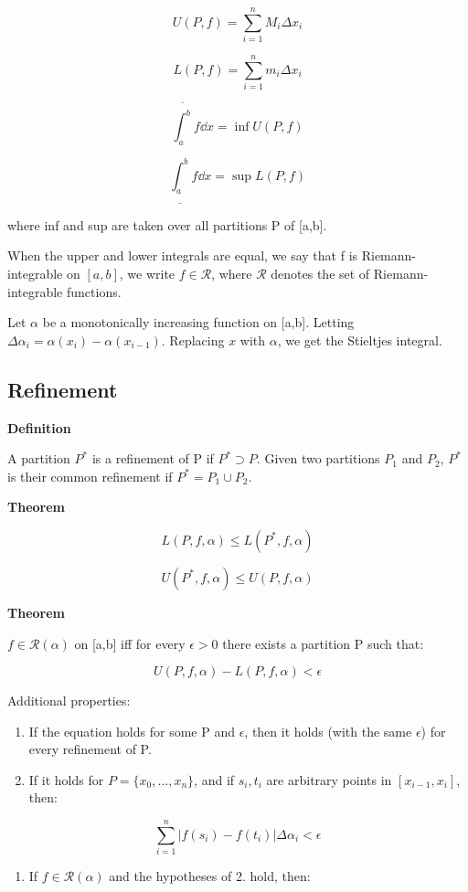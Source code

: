 \documentclass[11pt]{article}
\begin{document}
\[
U(P,f) = \sum_{i=1}^n M_i \Delta x_i
\]

\[
L(P,f) = \sum_{i=1}^n m_i \Delta x_i
\]

\[
\overline{\int_a^b} f \dd{x} = \inf U(P,f)
\]

\[
\underline{\int_a^b} f \dd{x} = \sup L(P,f)
\]

where inf and sup are taken over all partitions P of [a,b].

When the upper and lower integrals are equal, we say that f is Riemann-integrable on \([a,b]\), we write \(f \in \mathcal{R}\), where \(\mathcal{R}\) denotes the set of Riemann-integrable functions.


Let \(\alpha\) be a monotonically increasing function on [a,b]. Letting \(\Delta\alpha_i = \alpha(x_i) - \alpha(x_{i-1})\). Replacing \(x\) with \(\alpha\), we get the Stieltjes integral.

\subsection{Refinement}
\label{sec:orgd763a07}

\textbf{Definition}

A partition \(P^*\) is a refinement of P if \(P^* \supset P\). Given two partitions \(P_1\) and \(P_2\), \(P^*\) is their common refinement if \(P^* = P_1 \cup P_2\).

\textbf{Theorem}

\[
L(P,f,\alpha) \leq L(P^*,f,\alpha)
\]

\[
U(P^*,f,\alpha) \leq U(P,f,\alpha)
\]

\textbf{Theorem}

\(f \in \mathcal{R}(\alpha)\) on [a,b] iff for every \(\epsilon > 0\) there exists a partition P such that:

\[
U(P,f,\alpha) - L(P,f,\alpha) < \epsilon
\]

Additional properties:

\begin{enumerate}
\item If the equation holds for some P and \(\epsilon\), then it holds (with the same \(\epsilon\)) for every refinement of P.
\item If it holds for \(P = \{x_0,\ldots,x_n\}\), and if \(s_i,t_i\) are arbitrary points in \([x_{i-1},x_i]\), then:
\end{enumerate}
\[
\sum_{i=1}^n \vert f(s_i) - f(t_i) \vert \Delta \alpha_i < \epsilon
\]

\begin{enumerate}
\item If \(f \in \mathcal{R}(\alpha)\) and the hypotheses of 2. hold, then:
\end{enumerate}
\end{document}
